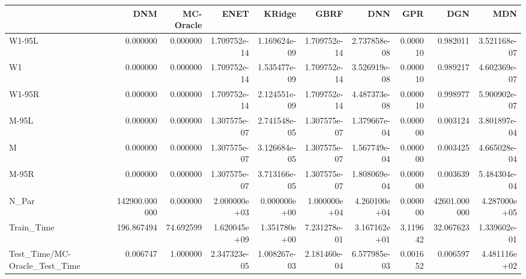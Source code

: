\begin{tabular}{lrrrrrrrrr}
\toprule
{} &            DNM &  MC-Oracle &          ENET &        KRidge &          GBRF &           DNN &       GPR &           DGN &           MDN \\
\midrule
W1-95L                        &       0.000000 &   0.000000 &  1.709752e-14 &  1.169624e-09 &  1.709752e-14 &  2.737858e-08 &  0.000010 &      0.982011 &  3.521168e-07 \\
W1                            &       0.000000 &   0.000000 &  1.709752e-14 &  1.535477e-09 &  1.709752e-14 &  3.526919e-08 &  0.000010 &      0.989217 &  4.602369e-07 \\
W1-95R                        &       0.000000 &   0.000000 &  1.709752e-14 &  2.124551e-09 &  1.709752e-14 &  4.487373e-08 &  0.000010 &      0.998977 &  5.900902e-07 \\
M-95L                         &       0.000000 &   0.000000 &  1.307575e-07 &  2.741548e-05 &  1.307575e-07 &  1.379667e-04 &  0.000000 &      0.003124 &  3.801897e-04 \\
M                             &       0.000000 &   0.000000 &  1.307575e-07 &  3.126684e-05 &  1.307575e-07 &  1.567749e-04 &  0.000000 &      0.003425 &  4.665028e-04 \\
M-95R                         &       0.000000 &   0.000000 &  1.307575e-07 &  3.713166e-05 &  1.307575e-07 &  1.808069e-04 &  0.000000 &      0.003639 &  5.484304e-04 \\
N\_Par                         &  142900.000000 &   0.000000 &  2.000000e+03 &  0.000000e+00 &  1.000000e+04 &  4.260100e+04 &  0.000000 &  42601.000000 &  4.287000e+05 \\
Train\_Time                    &     196.867494 &  74.692599 &  1.620045e+09 &  1.351780e+00 &  7.231278e-01 &  3.167162e+01 &  3.119642 &     32.067623 &  1.339602e-01 \\
Test\_Time/MC-Oracle\_Test\_Time &       0.006747 &   1.000000 &  2.347323e-05 &  1.008267e-03 &  2.181460e-04 &  6.577985e-03 &  0.001652 &      0.006597 &  4.481116e+02 \\
\bottomrule
\end{tabular}
